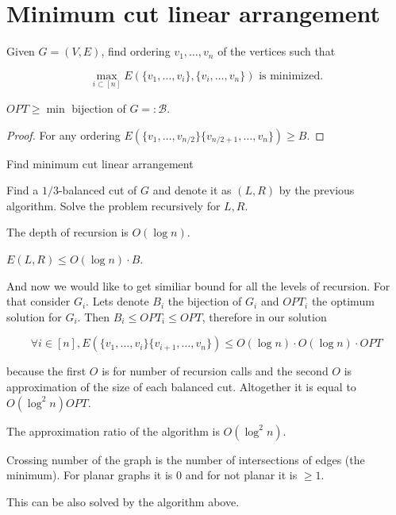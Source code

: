 \section{Minimum cut linear arrangement}

Given $G = (V,E)$, find ordering $v_1, \dots, v_n$ of the vertices such that

$$
\max_{i \subset [n]} E(\{v_{1}, \dots, v_{i}\}, \{v_{i}, \dots, v_{n}\}) \text{ is minimized.}
$$

\begin{observ}
	$OPT \geq \min$ bijection of $G = : \mathcal{B}$.
\end{observ}

\begin{proof}
	For any ordering $E(\{v_{1}, \dots, v_{n/2}\} \{v_{n/2 +1}, \dots, v_{n}\}) \geq B$.
\end{proof}

\begin{algorithm}
	\caption{Find minimum cut linear arrangement}
	\begin{algorithmic}[1]
		\State Find a $1/3$-balanced cut of $G$ and denote it as $(L,R)$ by the previous algorithm.
		\State Solve the problem recursively for $L,R$.
	\end{algorithmic}
\end{algorithm}

\begin{observ}
	The depth of recursion is $O(\log n)$.
\end{observ}

\begin{observ}
	$E(L,R) \leq O (\log n) \cdot B$.
\end{observ}

And now we would like to get similiar bound for all the levels of recursion. For that consider $G_{i}$. Lets denote $B_{i}$ the bijection of $G_{i}$ and $OPT_{i}$ the optimum solution for $G_{i}$. Then $B_{i} \leq OPT_{i} \leq OPT$, therefore in our solution

$$
\forall i \in [n], E(\{v_{1}, \dots, v_{i}\} \{v_{i+1}, \dots, v_{n}\}) \leq O(\log n) \cdot O(\log n) \cdot OPT
$$

because the first $O$ is for number of recursion calls and the second $O$ is approximation of the size of each balanced cut. Altogether it is equal to $O(\log^2 n) OPT$.

\begin{thm}
	The approximation ratio of the algorithm is $O(\log^2 n)$.
\end{thm}

\begin{defn}
	Crossing number of the graph is the number of intersections of edges (the minimum). For planar graphs it is 0 and for not planar it is $\geq 1$.
\end{defn}

This can be also solved by the algorithm above.